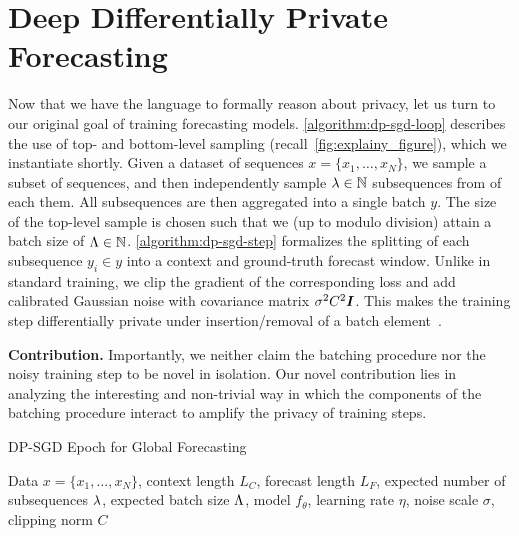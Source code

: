 \section{Deep Differentially Private Forecasting}\label{section:methods}
Now that we have the language to formally reason about privacy,
let us turn to our original goal of training forecasting models. 
\cref{algorithm:dp-sgd-loop} describes the 
use of top- and bottom-level sampling (recall~\cref{fig:explainy_figure}),
which we instantiate shortly. 
Given a dataset of sequences $x = \{x_1,\dots,x_N\}$,
we sample a subset of sequences,
and then independently sample $\lambda \in {\mathbb{N}}$ subsequences from of each them.
All subsequences are then aggregated into a single batch $y$.
The size of the top-level sample is chosen such that
we (up to modulo division) attain a batch size of $\Lambda \in {\mathbb{N}}$.
\cref{algorithm:dp-sgd-step} formalizes the splitting of each subsequence $y_i \in y$ into a context and ground-truth forecast window.
Unlike in standard training, we clip the gradient of the corresponding loss and
add calibrated Gaussian noise with covariance matrix $\sigma^2 C^2 {\bm{I}}$.
This makes the training step differentially private under insertion/removal of a 
 batch element~\cite{abadi2016deep}.

\textbf{Contribution.} 
Importantly, we neither claim the batching procedure nor the noisy training step to be novel in isolation. 
Our novel contribution lies in analyzing the interesting and non-trivial way in which the components of the batching procedure
interact to amplify the privacy of training steps.

\begin{algorithm}
   \caption{DP-SGD Epoch for Global Forecasting}
   \label{algorithm:dp-sgd-loop}
\begin{algorithmic}
    Data $x = \{x_1,\dots,x_N\}$, context length $L_C$, forecast length $L_F$, expected number of subsequences $\lambda$, expected batch size $\Lambda$, model $f_\theta$, learning rate $\eta$, noise scale $\sigma$,  clipping norm $C$
        \ENDFOR
    \ENDFOR
\end{algorithmic}
\end{algorithm}

